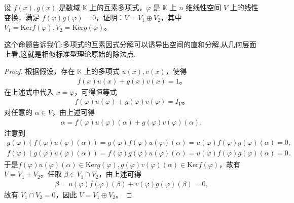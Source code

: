 \documentclass[../../main.tex]{subfiles}
\begin{document}
\begin{proposition}\label{proposition:互素多项式诱导直和分解1}
设 $f(x), g(x)$ 是数域 $\mathbb{K}$ 上的互素多项式，$\varphi$ 是 $\mathbb{K}$ 上 $n$ 维线性空间 $V$ 上的线性变换，满足 $f(\varphi)g(\varphi) = 0$，证明：$V = V_1 \oplus V_2$，其中 $V_1 = \text{Ker} f(\varphi), V_2 = \text{Ker} g(\varphi)$。
\end{proposition}
\begin{note}
这个命题告诉我们:多项式的互素因式分解可以诱导出空间的直和分解,从几何层面上看,这就是相似标准型理论原始的除法点.
\end{note}
\begin{proof}
根据假设，存在 $\mathbb{K}$ 上的多项式 $u(x), v(x)$，使得
\begin{align*}
f(x)u(x) + g(x)v(x) = 1。
\end{align*}
在上述式中代入 $x = \varphi$，可得恒等式
\begin{align*}
f(\varphi)u(\varphi) + g(\varphi)v(\varphi) = I_V。
\end{align*}
对任意的 $\alpha \in V$，由上述可得
\begin{align*}
\alpha = f(\varphi)u(\varphi)(\alpha) + g(\varphi)v(\varphi)(\alpha),
\end{align*}
注意到 
\begin{align*}
g\left( \varphi \right) \left( f\left( \varphi \right) u\left( \varphi \right) \left( \alpha \right) \right) =g\left( \varphi \right) f\left( \varphi \right) u\left( \varphi \right) \left( \alpha \right) =u\left( \varphi \right) f\left( \varphi \right) g\left( \varphi \right) \left( \alpha \right) =0,
\\
f\left( \varphi \right) \left( g\left( \varphi \right) u\left( \varphi \right) \left( \alpha \right) \right) =f\left( \varphi \right) g\left( \varphi \right) u\left( \varphi \right) \left( \alpha \right) =u\left( \varphi \right) f\left( \varphi \right) g\left( \varphi \right) \left( \alpha \right) =0.
\end{align*}
于是$f(\varphi)u(\varphi)(\alpha) \in \text{Ker} g(\varphi), g(\varphi)v(\varphi)(\alpha) \in \text{Ker} f(\varphi)$，故有 $V = V_1 + V_2$。任取 $\beta \in V_1 \cap V_2$，由上述可得
\begin{align*}
\beta = u(\varphi)f(\varphi)(\beta) + v(\varphi)g(\varphi)(\beta) = 0,
\end{align*}
故有 $V_1 \cap V_2 = 0$，因此 $V = V_1 \oplus V_2$。     
\end{proof}
\end{document}
